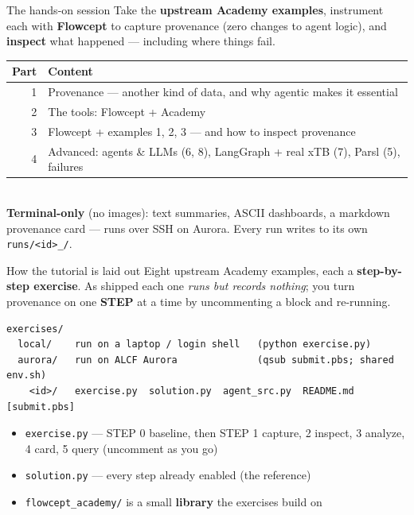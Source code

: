 \documentclass[aspectratio=169,11pt]{beamer}
\begin{document}
\begin{frame}{The hands-on session}
  Take the \textbf{upstream Academy examples}, instrument each with \textbf{Flowcept}
  to capture provenance (\alert{zero changes to agent logic}), and \textbf{inspect}
  what happened --- including \alert{where things fail}.
  \vspace{0.6em}
  \begin{tabular}{r l}
    \toprule
    \textbf{Part} & \textbf{Content} \\
    \midrule
    1 & Provenance --- another kind of data, and why agentic makes it essential \\
    2 & The tools: Flowcept + Academy \\
    3 & Flowcept + examples 1, 2, 3 --- and how to inspect provenance \\
    4 & Advanced: agents \& LLMs (6, 8), LangGraph + real xTB (7), Parsl (5), failures \\
    \bottomrule
  \end{tabular}
  \vspace{0.6em}\\
  \small \textbf{Terminal-only} (no images): text summaries, ASCII dashboards, a
  markdown provenance card --- runs over SSH on Aurora. Every run writes to its own
  \texttt{runs/<id>\_<date-time>/}.
\end{frame}

\begin{frame}[fragile]{How the tutorial is laid out}
  Eight upstream Academy examples, each a \textbf{step-by-step exercise}. As shipped
  each one \emph{runs but records nothing}; you turn provenance on one \textbf{STEP}
  at a time by uncommenting a block and re-running.
\begin{lstlisting}[style=sh]
exercises/
  local/    run on a laptop / login shell   (python exercise.py)
  aurora/   run on ALCF Aurora              (qsub submit.pbs; shared env.sh)
    <id>/   exercise.py  solution.py  agent_src.py  README.md  [submit.pbs]
\end{lstlisting}
  \begin{itemize}\small
    \item \texttt{exercise.py} --- STEP 0 baseline, then STEP 1 capture, 2 inspect,
      3 analyze, 4 card, 5 query (uncomment as you go)
    \item \texttt{solution.py} --- every step already enabled (the reference)
    \item \texttt{flowcept\_academy/} is a small \textbf{library} the exercises build on
  \end{itemize}
\end{frame}
\end{document}
